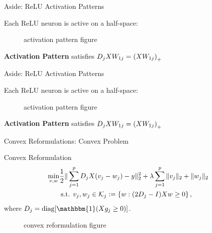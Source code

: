 \documentclass[usenames,dvipsnames,mathserif,notheorems]{beamer}
\newcommand{\good}[1]{\textcolor{good}{#1}}
\def\showtikz{}
\begin{document}
\begin{frame}{Aside: ReLU Activation Patterns}

	Each ReLU neuron is active on a half-space:

	\begin{figure}[]
		\centering
		\ifdefined\showtikz
			
		\else
			\Huge activation pattern figure
		\fi
	\end{figure}

	\pause
	\textbf{Activation Pattern} satisfies \( D_j X W_{1j} = \left(X W_{1j}\right)_+ \)

\end{frame}

\begin{frame}{Aside: ReLU Activation Patterns}

	Each ReLU neuron is active on a half-space:

	\begin{figure}[]
		\centering
		\ifdefined\showtikz
			
		\else
			\Huge activation pattern figure
		\fi
	\end{figure}


	\textbf{Activation Pattern} satisfies \( D_j X W_{1j} = \left(X W_{1j}\right)_+ \)

\end{frame}


\begin{frame}{Convex Reformulations: Convex Problem}

	{\large \good{Convex Reformulation}} \citep{pilanci2020convex}
	\[
		\begin{aligned}
			\min_{v, w} & \frac 1 2 \|\sum_{j=1}^p D_j X (v_j - w_j) - y\|_2^2 +
			\lambda \sum_{j=1}^p \|v_j\|_2 + \|w_j\|_2                    \\
			            & \hspace{0.2em} \text{s.t. }
			v_j, w_j \in \mathcal{K}_j := \left\{w : (2D_j - I) X w \geq 0\right\},
		\end{aligned}
	\]
	where \( D_j = \text{diag}[\mathbbm{1}(X g_j \geq 0)] \).
	\pause

	\begin{figure}[]
		\centering
		\ifdefined\showtikz
			
		\else
			\Huge convex reformulation figure
		\fi
	\end{figure}
\end{frame}
\end{document}

